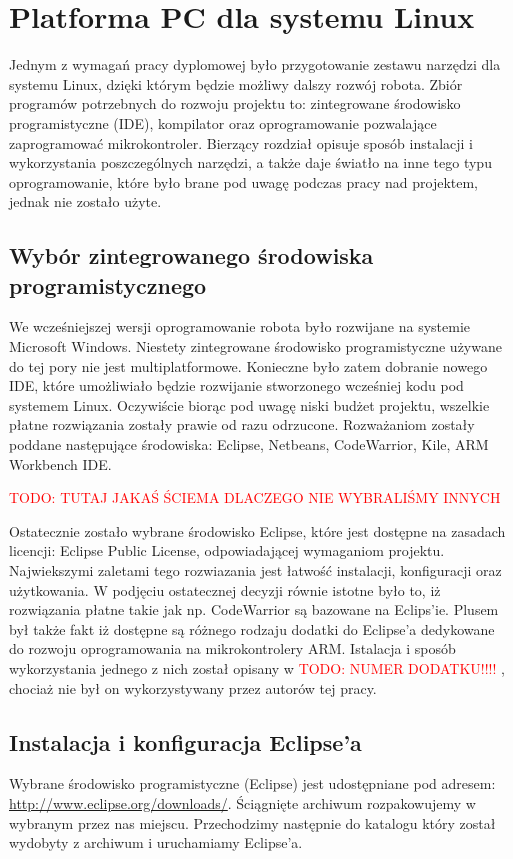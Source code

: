 \section{Platforma PC dla systemu Linux}
Jednym z wymagań pracy dyplomowej było przygotowanie zestawu narzędzi dla systemu Linux, dzięki którym będzie możliwy dalszy rozwój robota. Zbiór programów potrzebnych do rozwoju projektu to: zintegrowane środowisko programistyczne (IDE), kompilator oraz oprogramowanie pozwalające zaprogramować mikrokontroler. Bierzący rozdział opisuje sposób instalacji i wykorzystania poszczególnych narzędzi, a także daje światło na inne tego typu oprogramowanie, które było brane pod uwagę podczas pracy nad projektem, jednak nie zostało użyte.

\subsection{Wybór zintegrowanego środowiska programistycznego}
We wcześniejszej wersji oprogramowanie robota było rozwijane na systemie Microsoft Windows. Niestety zintegrowane środowisko programistyczne używane do tej pory nie jest multiplatformowe. Konieczne było zatem dobranie nowego IDE, które umożliwiało będzie rozwijanie stworzonego wcześniej kodu pod systemem Linux. Oczywiście biorąc pod uwagę niski budżet projektu, wszelkie płatne rozwiązania zostały prawie  od razu odrzucone. Rozważaniom zostały poddane następujące środowiska: Eclipse, Netbeans, CodeWarrior, Kile, ARM Workbench IDE.


\textcolor{red}{TODO: TUTAJ JAKAŚ ŚCIEMA DLACZEGO NIE WYBRALIŚMY INNYCH}


Ostatecznie zostało wybrane środowisko Eclipse, które jest dostępne na zasadach licencji: Eclipse Public License, odpowiadającej wymaganiom projektu. Najwiekszymi zaletami tego rozwiazania jest łatwość instalacji, konfiguracji oraz użytkowania. W podjęciu ostatecznej decyzji równie istotne było to, iż rozwiązania płatne takie jak np. CodeWarrior są bazowane na Eclips'ie. Plusem był także fakt iż dostępne są różnego rodzaju dodatki do Eclipse'a dedykowane do rozwoju oprogramowania na mikrokontrolery ARM. Istalacja i sposób wykorzystania jednego z nich został opisany w \textcolor{red}{ TODO: NUMER DODATKU!!!! }, chociaż nie był on wykorzystywany przez autorów tej pracy.

\subsection{Instalacja i konfiguracja Eclipse'a}
Wybrane środowisko programistyczne (Eclipse) jest udostępniane pod adresem: \url{http://www.eclipse.org/downloads/}. Ściągnięte archiwum rozpakowujemy w wybranym przez nas miejscu. Przechodzimy następnie do katalogu który został wydobyty z archiwum i uruchamiamy Eclipse'a.

